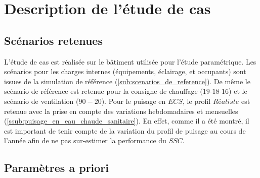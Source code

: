 




\section{Description de l’étude de cas} %
\label{sec:description_de_l_etude_de_cas}
\subsection{Scénarios retenues} %
\label{sub:scenarios_retenues}
L’étude de cas est réalisée sur le bâtiment utilisée pour l’étude paramétrique.
Les scénarios pour les charges internes (équipements, éclairage, et occupants) sont
issues de la simulation de référence (\ref{sub:scenarios_de_reference}). De même
le scénario de référence est retenue pour la consigne de chauffage ($19$-$18$-$16$)
et le scénario de ventilation ($90-20$).
Pour le puisage en $ECS$, le profil $Réaliste$ est retenue avec la prise en compte des
variations hebdomadaires et mensuelles (\ref{ssub:puisage_en_eau_chaude_sanitaire}).
En effet, comme il a été montré, il est important de tenir compte de la variation
du profil de puisage au cours de l’année afin de ne pas sur-estimer la performance
du $SSC$.



\subsection{Paramètres a priori} %
\label{sub:parametres_a_priori}
~


